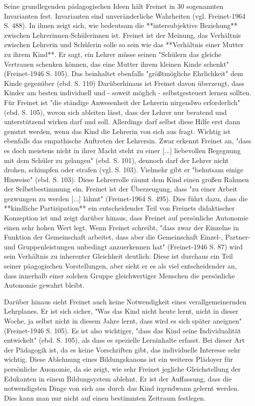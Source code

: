 Seine grundlegenden pädagogischen Ideen hält Freinet in 30 sogenannten Invarianten fest.
Invarianten sind unveränderliche Wahrheiten (vgl. Freinet-1964 S. 488).
In ihnen zeigt sich, wie bedeutsam die **intersubjektive Beziehung** zwischen Lehrerinnen-Schülerinnen ist.
Freinet ist der Meinung, das Verhältnis zwischen Lehrerin und Schülerin solle so sein wie das **Verhältnis einer Mutter zu ihrem Kind**.
Er sagt, ein Lehrer müsse seinen "Schülern das gleiche Vertrauen schenken können, das eine Mutter ihrem kleinen Kinde schenkt" (Freinet-1946 S. 105).
Das beinhaltet ebenfalls "größtmögliche Ehrlichkeit" dem Kinde gegenüber (ebd. S. 110)
Darüberhinaus ist Freinet davon überzeugt, dass Kinder am besten individuell und - soweit möglich - selbstgesteuert lernen sollten.
Für Freinet ist "die ständige Anwesenheit der Lehrerin nirgendwo erforderlich" (ebd. S. 105), wovon sich ableiten lässt, dass der Lehrer nur beratend und unterstützend wirken darf und soll.
Allerdings darf selbst diese Hilfe erst dann genutzt werden, wenn das Kind die Lehrerin von sich aus fragt.
Wichtig ist ebenfalls das empathische Auftreten der Lehrersin.
Zwar erkennt Freinet an, "dass es doch meistens nicht in ihrer Macht steht zu einer [...] liebevollen Begegnung mit dem Schüler zu gelangen" (ebd. S. 101), dennoch darf der Lehrer nicht drohen, schimpfen oder strafen (vgl. S. 103).
Vielmehr gibt er "behutsam einige Hinweise" (ebd. S. 103).
Diese Lehrerrolle räumt dem Kind einen großen Rahmen der Selbstbestimmung ein.
Freinet ist der Überzeugung, dass "zu einer Arbeit gezwungen zu werden [...] lähmt" (Freinet-1964 S. 495).
Dies führt dazu, dass die **kindliche Partizipation** ein entscheidender Teil von Freinets didaktischer Konzeption ist und zeigt darüber hinaus, dass Freinet auf persönliche Autonomie einen sehr hohen Wert legt.
Wenn Freinet schreibt, "dass zwar der Einzelne in Funktion der Gemeinschaft arbeitet, dass aber die Gemeinschaft Einzel-, Partner- und Gruppenleistungen unbedingt anzuerkennen hat" (Freinet-1946 S. 87) wird sein Verhältnis zu inherenter Gleichheit deutlich:
Diese ist durchaus ein Teil seiner päagogischen Vorstellungen, aber sieht er es als viel entscheidender an, dass innerhalb einer solchen Gruppe gleichwertiger Menschen die persönliche Autonomie gewahrt bleibt.

Darüber hinaus sieht Freinet auch keine Notwendigkeit eines verallgemeinernden Lehrplanes.
Er ist sich sicher, "Was das Kind nicht heute lernt, nicht in dieser Woche, ja selbst nicht in diesem Jahre lernt, dass wird es sich später aneignen" (Freinet-1946 S. 105).
Es ist also wichtiger, "dass das Kind seine Individualität entwickelt" (ebd. S. 105), als dass es spezielle Lerninhalte erfasst.
Bei dieser Art der Pädagogik ist, da es keine Vorschriften gibt, das individuelle Interesse sehr wichtig.
Diese Ablehnung eines Bildungskanons ist ein weiteres Plädoyer für persönliche Auonomie, da sie zeigt, wie sehr Freinet jegliche Gleichstellung der Edukanten in einem Bildungsystem ablehnt.
Er ist der Auffassung, dass die notwendigsten Dinge von sich aus durch das Kind irgendwann gelernt werden.
Dies kann man nur nicht auf einen bestimmten Zeitraum festlegen.

